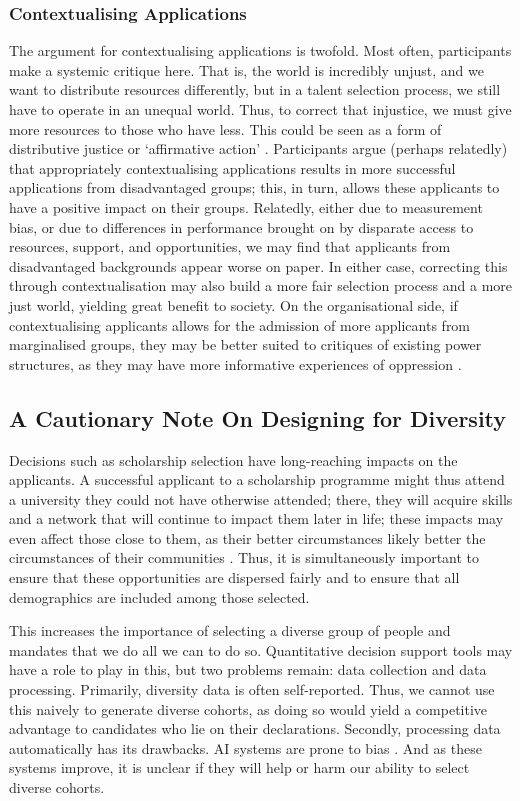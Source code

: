\subsubsection{Contextualising Applications}
The argument for contextualising applications is twofold. Most often, participants make a systemic critique here. That is, the world is incredibly unjust, and we want to distribute resources differently, but in a talent selection process, we still have to operate in an unequal world. Thus, to correct that injustice, we must give more resources to those who have less. This could be seen as a form of distributive justice or `affirmative action' \cite{Olsaretti_2018}. Participants argue (perhaps relatedly) that appropriately contextualising applications results in more successful applications from disadvantaged groups; this, in turn, allows these applicants to have a positive impact on their groups. Relatedly, either due to measurement bias, or due to differences in performance brought on by disparate access to resources, support, and opportunities, we may find that applicants from disadvantaged backgrounds appear worse on paper. In either case, correcting this through contextualisation may also build a more fair selection process and a more just world, yielding great benefit to society. On the organisational side, if contextualising applicants allows for the admission of more applicants from marginalised groups, they may be better suited to critiques of existing power structures, as they may have more informative experiences of oppression \cite{mills2015blackness}.

\subsection{A Cautionary Note On Designing for Diversity}
Decisions such as scholarship selection have long-reaching impacts on the applicants. A successful applicant to a scholarship programme might thus attend a university they could not have otherwise attended; there, they will acquire skills and a network that will continue to impact them later in life; these impacts may even affect those close to them, as their better circumstances likely better the circumstances of their communities \cite{Dassin_Marsh_Mawer_2018}. Thus, it is simultaneously important to ensure that these opportunities are dispersed fairly and to ensure that all demographics are included among those selected.

This increases the importance of selecting a diverse group of people and mandates that we do all we can to do so. Quantitative decision support tools may have a role to play in this, but two problems remain: data collection and data processing. Primarily, diversity data is often self-reported. Thus, we cannot use this naively to generate diverse cohorts, as doing so would yield a competitive advantage to candidates who lie on their declarations. Secondly, processing data automatically has its drawbacks. AI systems are prone to bias \cite{Friedler_Scheidegger_Venkatasubramanian_2016}. And as these systems improve, it is unclear if they will help or harm our ability to select diverse cohorts.

